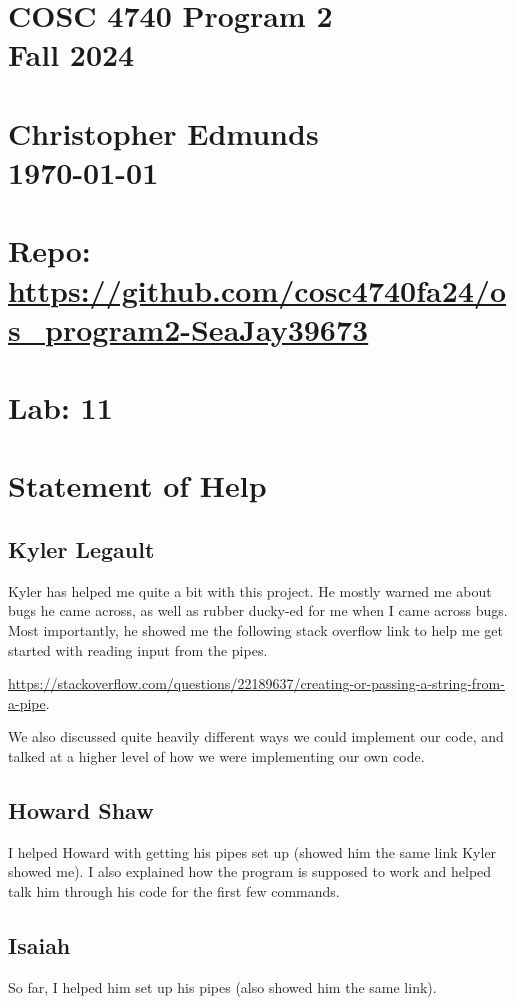 \documentclass{article}
\begin{document}
\begin{center}
    \section*{\textbf{COSC 4740 Program 2\\Fall 2024}}
    \section*{Christopher Edmunds\\ \today}
    \section*{Repo: \url{https://github.com/cosc4740fa24/os_program2-SeaJay39673}}
    \section*{Lab: 11}
\end{center}

\section*{Statement of Help}
\subsection*{Kyler Legault}
Kyler has helped me quite a bit with this project. He mostly warned me about bugs he came across, as well as rubber ducky-ed for me
when I came across bugs. Most importantly, he showed me the following stack overflow link to help me get started with reading input from the pipes.

\url{https://stackoverflow.com/questions/22189637/creating-or-passing-a-string-from-a-pipe}.

We also discussed quite heavily different ways we could implement our code, and talked at a higher level of how we were implementing our own code. 

\subsection*{Howard Shaw}
I helped Howard with getting his pipes set up (showed him the same link Kyler showed me).
I also explained how the program is supposed to work and helped talk him through his code for the first few commands.

\subsection*{Isaiah}
So far, I helped him set up his pipes (also showed him the same link).
\end{document}
